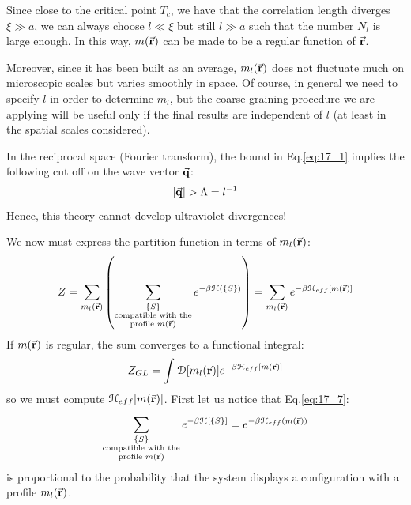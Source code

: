 \documentclass[../../Main/Main.tex]{subfiles}
\begin{document}
\begin{remark}
Since close to the critical point \( T_c \), we have that the correlation length diverges \( \xi \gg a \), we can always choose \( l \ll \xi  \) but still \( l \gg a \) such that the number \( N_l \) is large enough.
In this way, \( m(\va{r}) \) can be made to be a regular function of \( \va{r} \).
\end{remark}

Moreover, since it has been built as an average, \( m_l (\va{r}) \) does not fluctuate much on microscopic scales but varies smoothly in space. Of course, in general we need to specify \( l \) in order to determine \( m_l \), but the coarse graining procedure we are applying will be useful only if the final results are independent of \( l \)  (at least in the spatial scales considered).

\begin{remark}
In the reciprocal space (Fourier transform), the bound in Eq.\eqref{eq:17_1} implies the following cut off on the wave vector \( \va{q} \):
\begin{equation*}
  \abs{\va{q}} > \Lambda  = l^{-1}
\end{equation*}
Hence, this theory cannot develop ultraviolet divergences!
\end{remark}

We now must express the partition function in terms of \( m_l (\va{r}) \):
\begin{equation*}
  Z = \sum_{m_l (\va{r})}^{} \qty(\sum_{ \substack{ \{ S \} \\ \text{compatible with the} \\ \text{profile } m(\va{r})}   }^{} e^{-\beta \mathcal{H} ( \{ S \}  )}   )
 = \sum_{m_l(\va{r})}^{} e^{-\beta \mathcal{H}_{eff} [m(\va{r})]}
\end{equation*}
If \( m(\va{r}) \) is regular, the sum converges to a functional integral:
\begin{equation}
   Z_{GL} = \int_{}^{} \mathcal{D}  \qty[m_l (\va{r})]  e^{-\beta \mathcal{H}_{eff}[m(\va{r})]}
   \label{eq:17_8}
\end{equation}
so we must compute \( \mathcal{H}_{eff} [m(\va{r})] \).
First let us notice that Eq.\eqref{eq:17_7}:
\begin{equation*}
  \sum_{ \substack{ \{ S \} \\ \text{compatible with the} \\ \text{profile } m(\va{r})}   }^{} e^ {- \beta \mathcal{H} [ \{ S \}  ]}
  = e^{-\beta \mathcal{H}_{eff} (m (\va{r}))}
\end{equation*}
is proportional to the probability that the system displays a configuration with a profile \( m_l (\va{r}) \).
\end{document}
